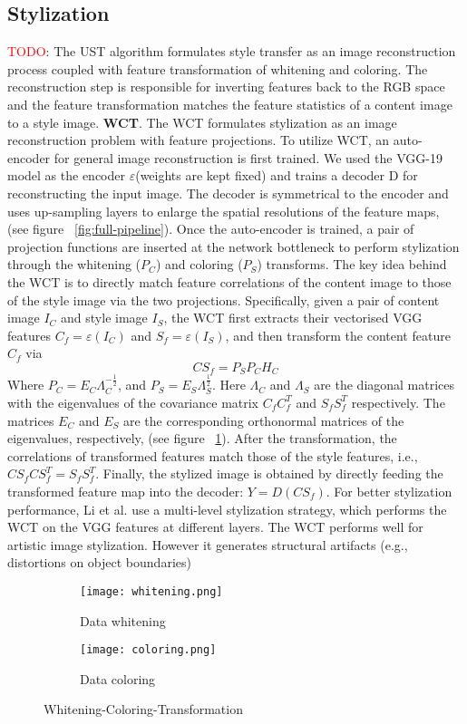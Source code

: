 \subsection{Stylization}\label{sec:method_stylization}
\textcolor{red}{TODO}: The UST algorithm formulates style transfer as an image reconstruction process coupled with feature transformation of whitening and coloring. The reconstruction step is responsible for inverting features back to the RGB space and the feature transformation matches the feature statistics of a content image to a style image.
\textbf{WCT}. The WCT \cite{bib11} formulates stylization as an image reconstruction problem with feature projections. To utilize WCT, an auto-encoder for general image reconstruction is first trained. We used the VGG-19 model \cite{bib20} as the encoder $\varepsilon$(weights are kept fixed) and trains a decoder D for reconstructing the input image. The decoder is symmetrical to the encoder and uses up-sampling layers to enlarge the spatial resolutions of the feature maps, (see figure ~\ref{fig:full-pipeline}). Once the auto-encoder is trained, a pair of projection functions are inserted at the network bottleneck to perform stylization through the whitening ($P_C$) and coloring ($P_S$) transforms. The key idea behind the WCT is to directly match feature correlations of the content image to those of the style image via the two projections. Specifically, given a pair of content image $I_C$ and style image $I_S$, the WCT first extracts their vectorised VGG features $C_f=\varepsilon(I_C)$ and $S_f=\varepsilon(I_S)$, and then transform the content feature $C_f$ via
\begin{equation}
CS_f = P_SP_CH_C
\end{equation}
Where $P_C=E_C\Lambda_C^{-\frac{1}{2}}$, and $P_S=E_S\Lambda_S^{\frac{1}{2}}$. Here $\Lambda_C$ and $\Lambda_S$ are the diagonal matrices with the eigenvalues of the covariance matrix $C_fC_f^T$ and $S_fS_f^T$ respectively. The matrices $E_C$ and $E_S$ are the corresponding orthonormal matrices of the eigenvalues, respectively, (see figure ~\ref{fig:WCT}). After the transformation, the correlations of
transformed features match those of the style features, i.e., $CS_fCS_f^T=S_fS_f^T$. Finally, the stylized image is obtained by directly feeding the transformed feature
map into the decoder: $Y = D(CS_f)$. For better stylization performance, Li et
al. \cite{bib11} use a multi-level stylization strategy, which performs the WCT on the
VGG features at different layers.
The WCT performs well for artistic image stylization. However it generates
structural artifacts (e.g., distortions on object boundaries)
\begin{figure}[h!]
	\centering
	\begin{subfigure}[b]{0.4\linewidth}
		\texttt{[image: whitening.png]}
		\caption{Data whitening}
	\end{subfigure}
	\begin{subfigure}[b]{0.4\linewidth}
		\texttt{[image: coloring.png]}
		\caption{Data coloring}
	\end{subfigure}
	\caption{Whitening-Coloring-Transformation}
	\label{fig:WCT}
\end{figure}


